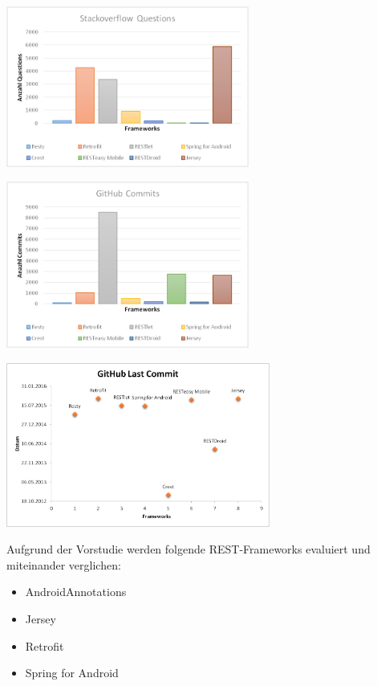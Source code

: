 \begin{minipage}{\textwidth} 
	\centering	
	\includegraphics[width=0.60\textwidth]{figures/stackoverflow_questions.png}
	\label{figure:stackoverflowQuestions}
	\vspace{2ex}
\end{minipage}

\begin{minipage}{\textwidth} 
	\centering	
	\includegraphics[width=0.60\textwidth]{figures/github_commits.png}
	\label{figure:githubCommits}
	\vspace{2ex}
\end{minipage}

\begin{minipage}{\textwidth} 
	\centering	
	\includegraphics[width=0.65\textwidth]{figures/github_lastCommit.png}
	\label{figure:githubLastCommit}
	\vspace{5ex}
\end{minipage}

Aufgrund der Vorstudie werden folgende REST-Frameworks evaluiert und miteinander verglichen:

\begin{itemize}
	\item AndroidAnnotations
	\item Jersey
	\item Retrofit 	
	\item Spring for Android
\end{itemize}
